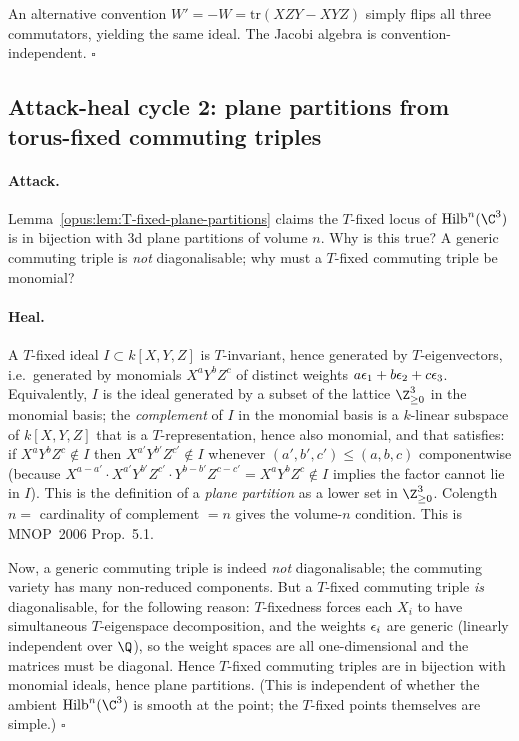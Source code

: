 An alternative convention $W' = -W = \mathrm{tr}(XZY - XYZ)$ simply flips all three
commutators, yielding the same ideal. The Jacobi algebra is convention-independent.
\hfill$\square$

\subsection{Attack-heal cycle 2: plane partitions from torus-fixed commuting triples}
\label{opus:sec:ah-2-plane-partitions}

\paragraph{Attack.}
Lemma~\ref{opus:lem:T-fixed-plane-partitions} claims the $T$-fixed locus of
$\Hilb^n(\C^3)$ is in bijection with 3d plane partitions of volume $n$. Why is this
true? A generic commuting triple is \emph{not} diagonalisable; why must a
$T$-fixed commuting triple be monomial?

\paragraph{Heal.}
A $T$-fixed ideal $I \subset k[X, Y, Z]$ is $T$-invariant, hence generated by $T$-eigenvectors,
i.e.\ generated by monomials $X^a Y^b Z^c$ of distinct weights $a\epsilon_1 + b\epsilon_2 + c\epsilon_3$.
Equivalently, $I$ is the ideal generated by a subset of the lattice $\Z_{\geq 0}^3$ in
the monomial basis; the \emph{complement} of $I$ in the monomial basis is a $k$-linear
subspace of $k[X,Y,Z]$ that is a $T$-representation, hence also monomial, and that
satisfies: if $X^a Y^b Z^c \notin I$ then $X^{a'} Y^{b'} Z^{c'} \notin I$ whenever
$(a', b', c') \leq (a, b, c)$ componentwise (because $X^{a-a'} \cdot X^{a'} Y^{b'} Z^{c'}
\cdot Y^{b-b'} Z^{c-c'} = X^a Y^b Z^c \notin I$ implies the factor cannot lie in $I$).
This is the definition of a \emph{plane partition} as a lower set in $\Z_{\geq 0}^3$.
Colength $n = $ cardinality of complement $= n$ gives the volume-$n$ condition.
This is MNOP~2006 Prop.~5.1.

Now, a generic commuting triple is indeed \emph{not} diagonalisable; the commuting
variety has many non-reduced components. But a $T$-fixed commuting triple \emph{is}
diagonalisable, for the following reason: $T$-fixedness forces each $X_i$ to have
simultaneous $T$-eigenspace decomposition, and the weights $\epsilon_i$ are generic (linearly
independent over $\Q$), so the weight spaces are all one-dimensional and the matrices
must be diagonal. Hence $T$-fixed commuting triples are in bijection with
monomial ideals, hence plane partitions. (This is independent of whether the ambient
$\Hilb^n(\C^3)$ is smooth at the point; the $T$-fixed points themselves are simple.)
\hfill$\square$

